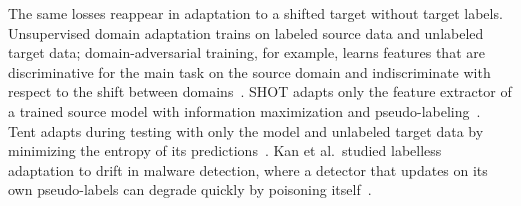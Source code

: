 The same losses reappear in adaptation to a shifted target without
target labels. Unsupervised domain adaptation trains on labeled source
data and unlabeled target data; domain-adversarial training, for
example, learns features that are discriminative for the main task on
the source domain and indiscriminate with respect to the shift between
domains~\cite{ganin2016domain}.
SHOT adapts only the feature extractor of a trained source model with
information maximization and pseudo-labeling~\cite{liang2020do}.
Tent adapts during testing with only the model and unlabeled target
data by minimizing the entropy of its predictions~\cite{wang2021tent}.
Kan et al.\ studied labelless adaptation to drift in malware
detection, where a detector that updates on its own pseudo-labels can
degrade quickly by poisoning itself~\cite{kan2021investigating}.

